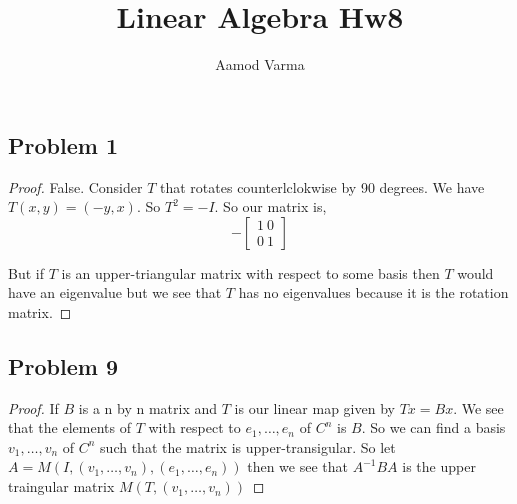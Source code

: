 \documentclass[a4paper]{report}
\title{Linear Algebra Hw8}
\author{Aamod Varma}
\begin{document}
\maketitle
\date{}

\subsection*{Problem 1}
\begin{proof}
   False. Consider $T$ that rotates counterlclokwise by 90 degrees. We have $T(x,y) = (-y,x)$. So  $T^2 = -I$. So our matrix is, 
   $$ -\begin{bmatrix} 1\ 0 \\ 0 \ 1

   \end{bmatrix}$$ 

   But if $T$ is an upper-triangular matrix with respect to some basis then $T$ would have an eigenvalue but we see that $T$ has no eigenvalues because it is the rotation matrix.
\end{proof}

\subsection*{Problem 9}
\begin{proof}
   If $B$ is a n by n matrix and $T$ is our linear map given by $Tx = Bx$. We see that the elements of $T$ with respect to $e_1,\dots,e_n$ of $C^{n}$ is $B$. So we can find a basis  $v_1,\dots,v_n$ of $C^{n}  $ such that the matrix is upper-transigular. So let $A = M(I,(v_1,\dots,v_n),(e_1,\dots,e_n))$ then we see that $A^{-1}BA$ is the upper traingular matrix $M(T,(v_1,\dots,v_n))$
\end{proof}
\end{document}
